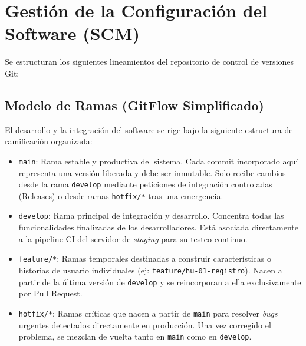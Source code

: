 \section{Gestión de la Configuración del Software (SCM)}

Se estructuran los siguientes lineamientos del repositorio de control de versiones Git:

\subsection{Modelo de Ramas (GitFlow Simplificado)}
El desarrollo y la integración del software se rige bajo la siguiente estructura de ramificación organizada:

\begin{itemize}
    \item \texttt{main}: Rama estable y productiva del sistema. Cada commit incorporado aquí representa una versión liberada y debe ser inmutable. Solo recibe cambios desde la rama \texttt{develop} mediante peticiones de integración controladas (Releases) o desde ramas \texttt{hotfix/*} tras una emergencia.
    
    \item \texttt{develop}: Rama principal de integración y desarrollo. Concentra todas las funcionalidades finalizadas de los desarrolladores. Está asociada directamente a la pipeline CI del servidor de \textit{staging} para su testeo continuo.
    
    \item \texttt{feature/*}: Ramas temporales destinadas a construir características o historias de usuario individuales (ej: \texttt{feature/hu-01-registro}). Nacen a partir de la última versión de \texttt{develop} y se reincorporan a ella exclusivamente por Pull Request.
    
    \item \texttt{hotfix/*}: Ramas críticas que nacen a partir de \texttt{main} para resolver \textit{bugs} urgentes detectados directamente en producción. Una vez corregido el problema, se mezclan de vuelta tanto en \texttt{main} como en \texttt{develop}.
\end{itemize}

